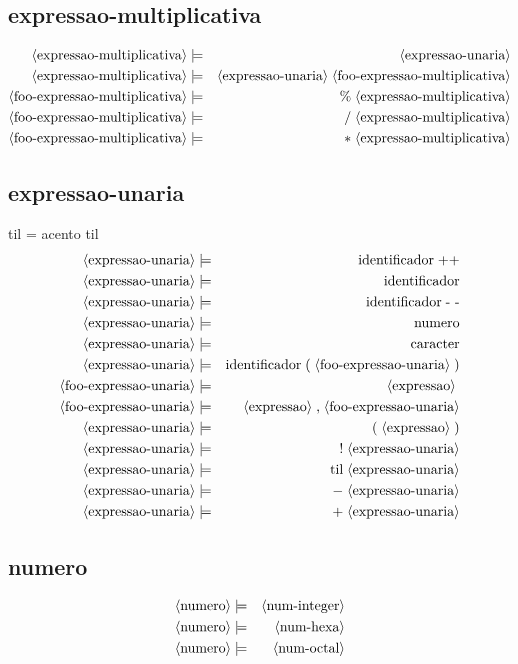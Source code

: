\documentclass[12pt,a4papper]{article}
\newcommand{\pn}[1]{\langle \textnormal{#1} \rangle}
\newcommand{\pp}{\models}
\newcommand{\ww}{\;}
\newcommand{\sm}[1]{\textnormal{#1}}
\begin{document}
\begin{landscape}
\subsection{expressao-multiplicativa}
\begin{eqnarray}
        \pn{expressao-multiplicativa} &\pp& \pn{expressao-unaria} \\
        \pn{expressao-multiplicativa} &\pp& \pn{expressao-unaria} \ww \pn{foo-expressao-multiplicativa} \\
    \pn{foo-expressao-multiplicativa} &\pp& \sm{\%} \ww \pn{expressao-multiplicativa} \\
        \pn{foo-expressao-multiplicativa} &\pp& \sm{/} \ww \pn{expressao-multiplicativa} \\
        \pn{foo-expressao-multiplicativa} &\pp& \sm{$*$} \ww \pn{expressao-multiplicativa}
\end{eqnarray}



\subsection{expressao-unaria}
til = acento til
\begin{eqnarray}
        \pn{expressao-unaria} &\pp& \sm{identificador}  \ww  \sm{++} \\
        \pn{expressao-unaria} &\pp& \sm{identificador} \\
        \pn{expressao-unaria} &\pp& \sm{identificador}  \ww  \sm{- -} \\
        \pn{expressao-unaria} &\pp& \sm{numero} \\
        \pn{expressao-unaria} &\pp& \sm{caracter} \\
        \pn{expressao-unaria} &\pp& \sm{identificador} \ww \sm{(} \ww \pn{foo-expressao-unaria} \ww \sm{)} \\
   \pn{foo-expressao-unaria}  &\pp& \pn{expressao} \ww \\
   \pn{foo-expressao-unaria}  &\pp& \pn{expressao} \ww \sm{,} \ww \pn{foo-expressao-unaria} \\
       \pn{expressao-unaria}  &\pp& \sm{(}  \ww   \pn{expressao}   \ww  \sm{)} \\
       \pn{expressao-unaria}  &\pp& \sm{!}  \ww  \pn{expressao-unaria} \\
       \pn{expressao-unaria}  &\pp& \sm{til}  \ww  \pn{expressao-unaria} \\
       \pn{expressao-unaria}  &\pp& \sm{$-$}  \ww  \pn{expressao-unaria} \\
       \pn{expressao-unaria}  &\pp& \sm{$+$}  \ww  \pn{expressao-unaria} 
      \end{eqnarray}


\subsection{numero}
\begin{eqnarray}
        \pn{numero} &\pp& \pn{num-integer} \\
        \pn{numero} &\pp& \pn{num-hexa} \\
        \pn{numero} &\pp& \pn{num-octal} 
\end{eqnarray}

\end{landscape}
\end{document}
